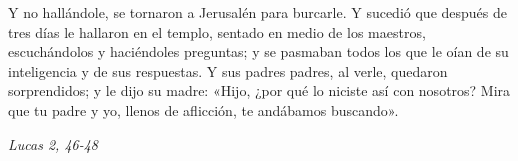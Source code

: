 \documentclass[../../devocionario.tex]{subfiles}
\begin{document}
    Y no hallándole, se tornaron a Jerusalén para burcarle. Y sucedió que después de tres días le hallaron en el templo, 
    sentado en medio de los maestros,     escuchándolos y haciéndoles preguntas; y se pasmaban todos los que le oían de su 
    inteligencia y de sus respuestas. Y sus padres padres, al verle, quedaron sorprendidos; y le dijo su madre: 
    «Hijo, ¿por qué lo niciste así con nosotros? Mira que tu padre y yo, llenos de aflicción, te andábamos buscando». 
    \begin{flushright}
        \textit{Lucas 2, 46-48}
    \end{flushright}
\end{document}
